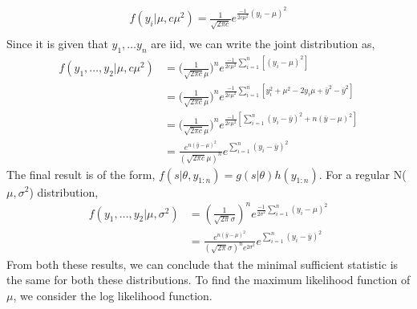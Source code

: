 \documentclass[11pt]{article}
\begin{document}
\begin{equation}
  \nonumber
  \begin{aligned}
    f(y_{i} | \mu, c\mu^{2}) = \frac{1}{\sqrt{2\pi c}}e^{\frac{-1}{2c \mu^{2}}(y_{i} - \mu)^{2}}\\
  \end{aligned}
\end{equation}
Since it is given that $y_{1}, \dots y_{n}$ are iid, we can write the joint distribution as,
\begin{equation}
  \nonumber
  \begin{aligned}
    f(y_{1}, \dots, y_{2} | \mu, c\mu^{2}) & = \bigg(\frac{1}{\sqrt{2\pi c}\mu}\bigg)^{n}e^{\frac{-1}{2c \mu^{2}}\sum_{i = 1}^{n}[(y_{i} - \mu)^{2}]}\\
    & = \bigg(\frac{1}{\sqrt{2\pi c}\mu}\bigg)^{n}e^{\frac{-1}{2c \mu^{2}}\sum_{i = 1}^{n}[y_{i}^{2} + \mu^{2} - 2 y_{i}\mu + \bar{y}^{2} - \bar{y}^{2}]}\\
    & = \bigg(\frac{1}{\sqrt{2\pi c}\mu}\bigg)^{n}e^{\frac{-1}{2c \mu^{2}}[\sum_{i = 1}^{n}(y_{i} - \bar{y})^{2} + n(\bar{y} - \mu)^{2}]}\\
    & = \frac{e^{n(\bar{y} - \mu)^{2}}}{(\sqrt{2\pi c}\mu)^{n}}e^{\sum_{i = 1}^{n}(y_{i} - \bar{y})^{2}}
  \end{aligned}
\end{equation}
The final result is of the form, $f(s|\theta, y_{1:n}) = g(s|\theta)h(y_{1:n})$. For a regular N($\mu, \sigma^{2}$) distribution,
\begin{equation}
  \nonumber
  \begin{aligned}
    f(y_{1}, \dots, y_{2} | \mu, \sigma^{2}) & = (\frac{1}{\sqrt{2 \pi} \sigma})^{n} e^{\frac{-1}{2\sigma^{2}} \sum_{i = 1}^{n} (y_{i} - \mu)^{2}}\\
    & = \frac{e^{n(\bar{y} - \mu)^{2}}}{(\sqrt{2 \pi} \sigma)^{n} e^{2 \sigma^{2}}}e^{\sum_{i = 1}^{n} (y_{i} - \bar{y})^{2}}
  \end{aligned}
\end{equation}
From both these results, we can conclude that the minimal sufficient statistic is the same for both these distributions. To find the maximum likelihood function of $\mu$, we consider the log likelihood function.
\end{document}
